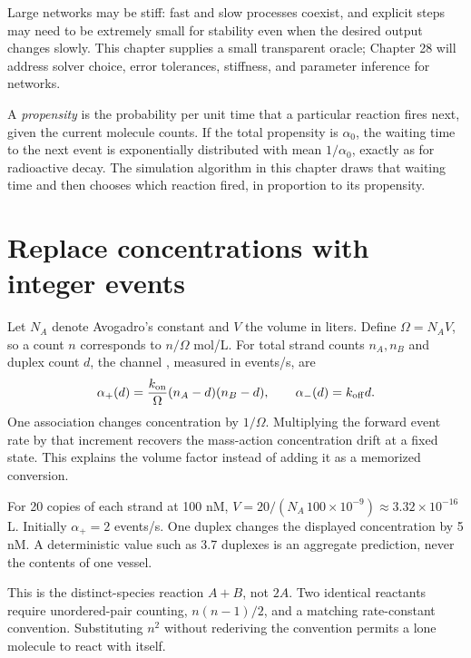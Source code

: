 Large networks may be stiff: fast and slow processes coexist, and explicit
steps may need to be extremely small for stability even when the desired
output changes slowly. This chapter supplies a small transparent oracle;
Chapter 28 will address solver choice, error tolerances, stiffness, and
parameter inference for networks.

\begin{CSBridge}
A \emph{propensity} is the probability per unit time that a particular reaction
fires next, given the current molecule counts. If the total propensity is
$\alpha_0$, the waiting time to the next event is exponentially distributed with
mean $1/\alpha_0$, exactly as for radioactive decay. The simulation algorithm in
this chapter draws that waiting time and then chooses which reaction fired, in
proportion to its propensity.
\end{CSBridge}

\section{Replace concentrations with integer events}

Let $N_A$ denote Avogadro's constant and $V$ the volume in liters.
Define $\Omega=N_A V$, so a count $n$ corresponds to $n/\Omega$ mol/L.
For total strand counts $n_A,n_B$ and duplex count $d$, the channel
, measured in events/s, are
\begin{equation}
 \alpha_+(d)=\frac{k_{\rm on}}{\Omega}(n_A-d)(n_B-d),
 \qquad \alpha_-(d)=k_{\rm off}d.
 \label{eq:propensity}
\end{equation}
One association changes concentration by $1/\Omega$.
Multiplying the forward event rate by that increment recovers the
mass-action concentration drift at a fixed state. This explains the
volume factor instead of adding it as a memorized conversion.


For 20 copies of each strand at 100 nM,
$V=20/(N_A\,100\times10^{-9})\approx3.32\times10^{-16}$ L.
Initially $\alpha_+=2$ events/s. One duplex changes the displayed
concentration by 5 nM. A deterministic value such as 3.7 duplexes is
an aggregate prediction, never the contents of one vessel.

This is the distinct-species reaction $A+B$, not $2A$. Two identical
reactants require unordered-pair counting, $n(n-1)/2$, and a matching
rate-constant convention. Substituting $n^2$ without rederiving the
convention permits a lone molecule to react with itself.

